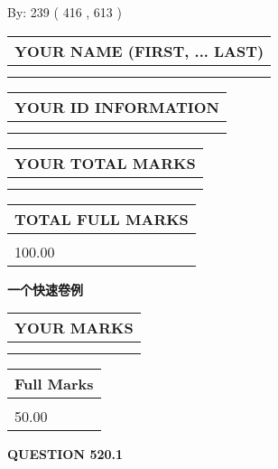 \documentclass{ctexart}
\begin{document}
   
\hspace{1.0in} By: 
 239 ( 416 ,  613 )
   
   
   
   
\newpage 
\setcounter{page}{ 
   520001 } 
   
   
   
   
\noindent\begin{tabular}{|l|}
\hline
YOUR NAME (FIRST, ... LAST)  \\
\hline
 \\ 
 \\ 
\hline
\end{tabular}
\hspace{0.05in} \begin{tabular}{|l|}
\hline
 YOUR   ID   INFORMATION  \\
\hline
 \\ 
 \\ 
\hline
\end{tabular}
   
   
\vspace{0.2in}\noindent\begin{tabular}{|l|}
\hline
YOUR TOTAL MARKS  \\
\hline
 \\ 
 \\ 
\hline
\end{tabular}
\hspace{0.05in} \begin{tabular}{|l|}
\hline
TOTAL FULL MARKS  \\
\hline
 \\ 
100.00 \\
\hline
\end{tabular}
   
   
 \vspace{0.2in}
{\LARGE {\textbf{ 一个快速卷例}}}
   
   
  
\vspace{0.2in}
  
\noindent\begin{tabular}{|l|}
\hline
 YOUR MARKS  \\
\hline
 \\ 
 \\ 
\hline
\end{tabular}
\hspace{0.05in} \begin{tabular}{|l|}
\hline
 Full Marks  \\
\hline
 \\ 
50.00 \\
\hline
\end{tabular}
{\textbf{\Large{QUESTION
520.1 
}}}
  
\end{document}
